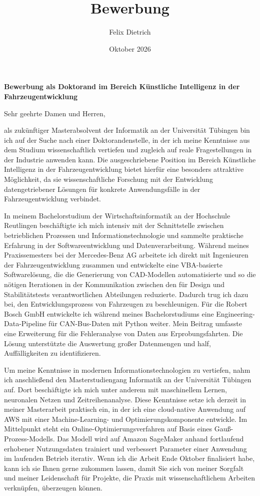\documentclass[11pt]{article}
\title{Bewerbung}
\author{Felix Dietrich}
\date{Oktober 2026}
\begin{document}
\textbf{Bewerbung als Doktorand im Bereich Künstliche Intelligenz in der Fahrzeugentwicklung}

\bigskip

Sehr geehrte Damen und Herren,

als zukünftiger Masterabsolvent der Informatik an der Universität Tübingen bin ich auf der Suche nach einer Doktorandenstelle, in der ich meine Kenntnisse aus dem Studium wissenschaftlich vertiefen und zugleich auf reale Fragestellungen in der Industrie anwenden kann. Die ausgeschriebene Position im Bereich Künstliche Intelligenz in der Fahrzeugentwicklung bietet hierfür eine besonders attraktive Möglichkeit, da sie wissenschaftliche Forschung mit der Entwicklung datengetriebener Lösungen für konkrete Anwendungsfälle in der Fahrzeugentwicklung verbindet.

In meinem Bachelorstudium der Wirtschaftsinformatik an der Hochschule Reutlingen beschäftigte ich mich intensiv mit der Schnittstelle zwischen betrieblichen Prozessen und Informationstechnologie und sammelte praktische Erfahrung in der Softwareentwicklung und Datenverarbeitung. Während meines Praxissemesters bei der Mercedes-Benz AG arbeitete ich direkt mit Ingenieuren der Fahrzeugentwicklung zusammen und entwickelte eine VBA-basierte Softwarelösung, die die Generierung von CAD-Modellen automatisierte und so die nötigen Iterationen in der Kommunikation zwischen den für Design und Stabilitätstests verantwortlichen Abteilungen reduzierte. Dadurch trug ich dazu bei, den Entwicklungsprozess von Fahrzeugen zu beschleunigen. Für die Robert Bosch GmbH entwickelte ich während meines Bachelorstudiums eine Engineering-Data-Pipeline für CAN-Bus-Daten mit Python weiter. Mein Beitrag umfasste eine Erweiterung für die Fehleranalyse von Daten aus Erprobungsfahrten. Die Lösung unterstützte die Auswertung großer Datenmengen und half, Auffälligkeiten zu identifizieren.

Um meine Kenntnisse in modernen Informationstechnologien zu vertiefen, nahm ich anschließend den Masterstudiengang Informatik an der Universität Tübingen auf. Dort beschäftigte ich mich unter anderem mit maschinellem Lernen, neuronalen Netzen und Zeitreihenanalyse. Diese Kenntnisse setze ich derzeit in meiner Masterarbeit praktisch ein, in der ich eine cloud-native Anwendung auf AWS mit einer Machine-Learning- und Optimierungskomponente entwickle. Im Mittelpunkt steht ein Online-Optimierungsverfahren auf Basis eines Gauß-Prozess-Modells. Das Modell wird auf Amazon SageMaker anhand fortlaufend erhobener Nutzungsdaten trainiert und verbessert Parameter einer Anwendung im laufenden Betrieb iterativ. Wenn ich die Arbeit Ende Oktober finalisiert habe, kann ich sie Ihnen gerne zukommen lassen, damit Sie sich von meiner Sorgfalt und meiner Leidenschaft für Projekte, die Praxis mit wissenschaftlichem Arbeiten verknüpfen, überzeugen können.
\end{document}
